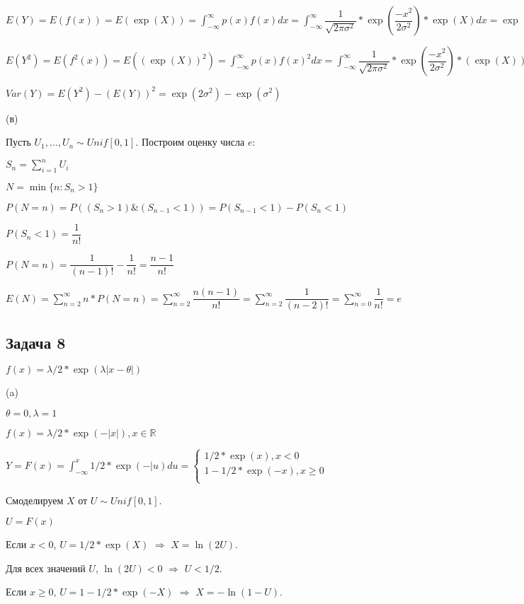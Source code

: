 \documentclass[a4paper,12pt]{article} %
\begin{document}
$E(Y) = E(f(x)) = E(\exp(X) ) =  \int_{-\infty}^{\infty} p(x) f(x) dx    = \int_{-\infty}^{\infty} \dfrac{1}{\sqrt{2\pi \sigma^2}} *\exp(\dfrac{-x^2}{2\sigma^2}) * \exp(X) dx = \exp(\sigma^2/2)   $

$E(Y^2) = E(f^2(x)) = E((\exp(X))^2 ) =  \int_{-\infty}^{\infty} p(x) f(x)^2 dx     = \int_{-\infty}^{\infty} \dfrac{1}{\sqrt{2\pi \sigma^2}} *\exp(\dfrac{-x^2}{2\sigma^2}) * (\exp(X))^2 dx = \exp(2\sigma^2)   $

$Var(Y) =E(Y^2) - (E(Y))^2 =\exp(2\sigma^2)  - \exp(\sigma^2)    $


(в)

Пусть $U_1, ..., U_n \sim Unif[0,1]$. Построим оценку числа  $e$: 

$S_n = \sum_{i=1}^n U_i$

$N = \min\{n:S_n>1\}$

$P(N=n) = P((S_n>1)\&(S_{n-1} < 1) ) =  P(S_{n-1} < 1) -  P(S_n<1 )  $

$P(S_n<1 )  = \dfrac{1}{n!}$
 
$P(N=n) = \dfrac{1}{(n-1)!} - \dfrac{1}{n!} = \dfrac{n-1}{n!} $


$E(N) = \sum_{n=2}^{\infty}   n*P(N=n) =  \sum_{n=2}^{\infty}   \dfrac{n(n-1)}{n!} =  \sum_{n=2}^{\infty}   \dfrac{1}{(n-2)!} =  \sum_{n=0}^{\infty}   \dfrac{1}{n!}  = e $

 
\subsection*{Задача 8}

$f(x) = \lambda/2* \exp(\lambda|x-\theta|)$

(a) 


$\theta = 0, \lambda = 1  $

$f(x) = \lambda/2 * \exp(-|x|), x \in \mathbb{R}$

$Y=F(x) = \int_{-\infty}^{x} 1/2* \exp(-|u) du = \begin{cases}
1/2*\exp(x), x<0\\
1-1/2*\exp(-x), x\geq0\\
\end{cases}$


Смоделируем $X$ от $U\sim Unif[0,1]$. 

$U = F(x)$

Если  $x<0$, $U=1/2*\exp(X)$ $\Rightarrow$  $X=\ln(2U)$.

Для всех значений $U$, $\ln(2U)<0$ $\Rightarrow$  $U<1/2$.

Если  $x\geq0$, $U=1-1/2*\exp(-X)$ $\Rightarrow$  $X=-\ln(1-U)$. 
\end{document}
